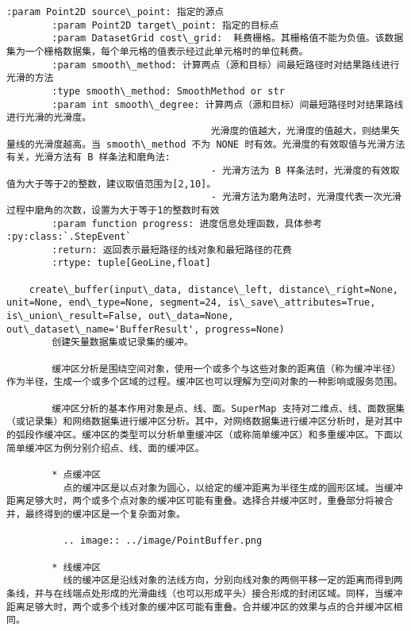 \documentclass[11pt]{article}
\begin{document}
\begin{Verbatim}[commandchars=\\\{\}]
        :param Point2D source\_point: 指定的源点
        :param Point2D target\_point: 指定的目标点
        :param DatasetGrid cost\_grid:  耗费栅格。其栅格值不能为负值。该数据集为一个栅格数据集，每个单元格的值表示经过此单元格时的单位耗费。
        :param smooth\_method: 计算两点（源和目标）间最短路径时对结果路线进行光滑的方法
        :type smooth\_method: SmoothMethod or str
        :param int smooth\_degree: 计算两点（源和目标）间最短路径时对结果路线进行光滑的光滑度。
                                    光滑度的值越大，光滑度的值越大，则结果矢量线的光滑度越高。当 smooth\_method 不为 NONE 时有效。光滑度的有效取值与光滑方法有关，光滑方法有 B 样条法和磨角法:
                                    - 光滑方法为 B 样条法时，光滑度的有效取值为大于等于2的整数，建议取值范围为[2,10]。
                                    - 光滑方法为磨角法时，光滑度代表一次光滑过程中磨角的次数，设置为大于等于1的整数时有效
        :param function progress: 进度信息处理函数，具体参考 :py:class:`.StepEvent`
        :return: 返回表示最短路径的线对象和最短路径的花费
        :rtype: tuple[GeoLine,float]
    
    create\_buffer(input\_data, distance\_left, distance\_right=None, unit=None, end\_type=None, segment=24, is\_save\_attributes=True, is\_union\_result=False, out\_data=None, out\_dataset\_name='BufferResult', progress=None)
        创建矢量数据集或记录集的缓冲。
        
        缓冲区分析是围绕空间对象，使用一个或多个与这些对象的距离值（称为缓冲半径）作为半径，生成一个或多个区域的过程。缓冲区也可以理解为空间对象的一种影响或服务范围。
        
        缓冲区分析的基本作用对象是点、线、面。SuperMap 支持对二维点、线、面数据集（或记录集）和网络数据集进行缓冲区分析。其中，对网络数据集进行缓冲区分析时，是对其中的弧段作缓冲区。缓冲区的类型可以分析单重缓冲区（或称简单缓冲区）和多重缓冲区。下面以简单缓冲区为例分别介绍点、线、面的缓冲区。
        
        * 点缓冲区
          点的缓冲区是以点对象为圆心，以给定的缓冲距离为半径生成的圆形区域。当缓冲距离足够大时，两个或多个点对象的缓冲区可能有重叠。选择合并缓冲区时，重叠部分将被合并，最终得到的缓冲区是一个复杂面对象。
        
          .. image:: ../image/PointBuffer.png
        
        * 线缓冲区
          线的缓冲区是沿线对象的法线方向，分别向线对象的两侧平移一定的距离而得到两条线，并与在线端点处形成的光滑曲线（也可以形成平头）接合形成的封闭区域。同样，当缓冲距离足够大时，两个或多个线对象的缓冲区可能有重叠。合并缓冲区的效果与点的合并缓冲区相同。
        

\end{Verbatim}
\end{document}
